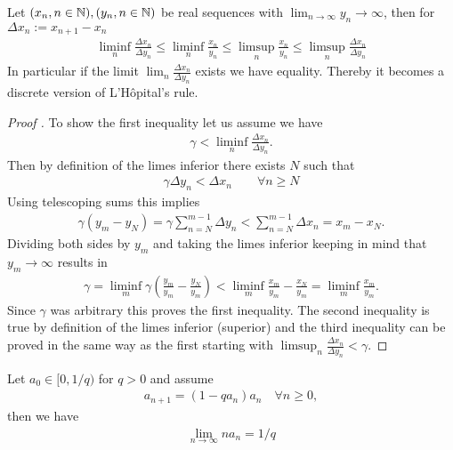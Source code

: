 \begin{theorem}\label{thm-appendix: cesaro-stolz}
	Let \((x_n, n\in\mathbb{N}),(y_n, n\in\mathbb{N})\) be real sequences with
	\(\lim_{n\to\infty}y_n\to\infty\), then for \(\Delta x_n:=x_{n+1}-x_n\)
	\begin{align}
		\liminf_n \frac{\Delta x_n}{\Delta y_n}
		\le \liminf_n \frac{x_n}{y_n} 
		\le \limsup_n \frac{x_n}{y_n} 
		\le \limsup_n \frac{\Delta x_n}{\Delta y_n}
	\end{align}
	In particular if the limit \(\lim_n\frac{\Delta x_n}{\Delta y_n}\) exists
	we have equality. Thereby it becomes a discrete version of L'Hôpital's
	rule.
\end{theorem}
\begin{proof}[{Proof \parencite{IMOmathHopitalTheorem}}]
	To show the first inequality let us assume we have
	\begin{align*}
		\gamma < \liminf_n \frac{\Delta x_n}{\Delta y_n}.
	\end{align*}
	Then by definition of the limes inferior there exists \(N\) such that
	\begin{align*}
		\gamma \Delta y_n < \Delta x_n \qquad \forall n\ge N
	\end{align*}
	Using telescoping sums this implies
	\begin{align*}
		\gamma (y_m- y_N)
		= \gamma \sum_{n=N}^{m-1} \Delta y_n
		< \sum_{n=N}^{m-1} \Delta x_n
		= x_m- x_N.
	\end{align*}
	Dividing both sides by \(y_m\) and taking the limes inferior keeping in
	mind that \(y_m\to\infty\) results in
	\begin{align*}
		\gamma = \liminf_m \gamma\left(\frac{y_m}{y_m} - \frac{y_N}{y_m}\right)
		< \liminf_m \frac{x_m}{y_m} - \frac{x_N}{y_m}
		= \liminf_m \frac{x_m}{y_m}.
	\end{align*}
	Since \(\gamma\) was arbitrary this proves the first inequality. The second
	inequality is true by definition of the limes inferior (superior) and the
	third inequality can be proved in the same way as the first starting with
	\(\limsup_n \frac{\Delta x_n}{\Delta y_n} < \gamma\).
\end{proof}
\begin{lemma}
	\label{lem-appendix: diminishing contraction}
	Let \(a_0 \in [0, 1/q)\) for \(q>0\) and assume 
	\begin{align*}
		a_{n+1} = (1-q a_n)a_n \quad \forall n \ge 0,
	\end{align*}
	then we have
	\begin{align}
		\lim_{n\to\infty} n a_n = 1/q
	\end{align}
\end{lemma}
